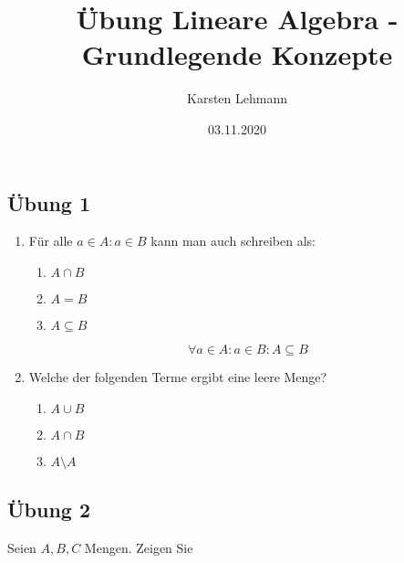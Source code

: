\documentclass{article}
\author{Karsten Lehmann}
\date{03.11.2020}
\title{Übung Lineare Algebra - Grundlegende Konzepte}
\begin{document}
\maketitle
\newpage

\subsection*{Übung 1}
\begin{enumerate}
\item Für alle $a \in A \colon a \in B$ kann man auch schreiben als:
  \begin{enumerate}
  \item $A \cap B$
  \item $A = B$
  \item $A \subseteq B$
  \end{enumerate}
  \[
    \forall a \in A \colon a \in B \colon A \subseteq B
  \]
\item Welche der folgenden Terme ergibt eine leere Menge?
  \begin{enumerate}
  \item $A \cup B$
  \item $A \cap B$
  \item $A \setminus A$
  \end{enumerate}
\end{enumerate}

\subsection*{Übung 2}

Seien $A,B,C$ Mengen. Zeigen Sie
\end{document}
